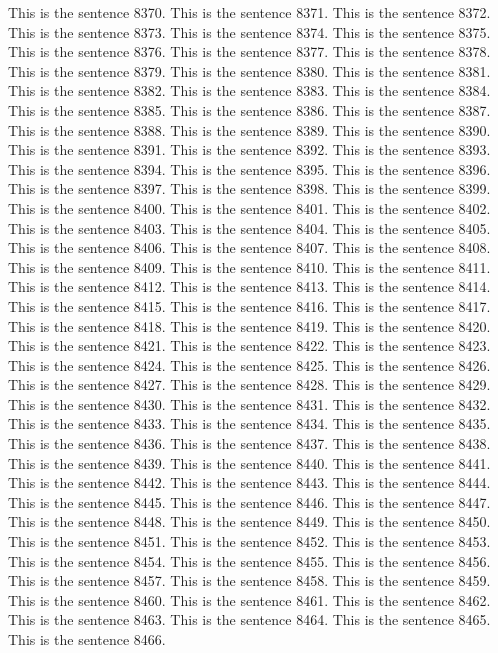 \documentclass{article}
\begin{document}
This is the sentence 8370.
This is the sentence 8371.
This is the sentence 8372.
This is the sentence 8373.
This is the sentence 8374.
This is the sentence 8375.
This is the sentence 8376.
This is the sentence 8377.
This is the sentence 8378.
This is the sentence 8379.
This is the sentence 8380.
This is the sentence 8381.
This is the sentence 8382.
This is the sentence 8383.
This is the sentence 8384.
This is the sentence 8385.
This is the sentence 8386.
This is the sentence 8387.
This is the sentence 8388.
This is the sentence 8389.
This is the sentence 8390.
This is the sentence 8391.
This is the sentence 8392.
This is the sentence 8393.
This is the sentence 8394.
This is the sentence 8395.
This is the sentence 8396.
This is the sentence 8397.
This is the sentence 8398.
This is the sentence 8399.
This is the sentence 8400.
This is the sentence 8401.
This is the sentence 8402.
This is the sentence 8403.
This is the sentence 8404.
This is the sentence 8405.
This is the sentence 8406.
This is the sentence 8407.
This is the sentence 8408.
This is the sentence 8409.
This is the sentence 8410.
This is the sentence 8411.
This is the sentence 8412.
This is the sentence 8413.
This is the sentence 8414.
This is the sentence 8415.
This is the sentence 8416.
This is the sentence 8417.
This is the sentence 8418.
This is the sentence 8419.
This is the sentence 8420.
This is the sentence 8421.
This is the sentence 8422.
This is the sentence 8423.
This is the sentence 8424.
This is the sentence 8425.
This is the sentence 8426.
This is the sentence 8427.
This is the sentence 8428.
This is the sentence 8429.
This is the sentence 8430.
This is the sentence 8431.
This is the sentence 8432.
This is the sentence 8433.
This is the sentence 8434.
This is the sentence 8435.
This is the sentence 8436.
This is the sentence 8437.
This is the sentence 8438.
This is the sentence 8439.
This is the sentence 8440.
This is the sentence 8441.
This is the sentence 8442.
This is the sentence 8443.
This is the sentence 8444.
This is the sentence 8445.
This is the sentence 8446.
This is the sentence 8447.
This is the sentence 8448.
This is the sentence 8449.
This is the sentence 8450.
This is the sentence 8451.
This is the sentence 8452.
This is the sentence 8453.
This is the sentence 8454.
This is the sentence 8455.
This is the sentence 8456.
This is the sentence 8457.
This is the sentence 8458.
This is the sentence 8459.
This is the sentence 8460.
This is the sentence 8461.
This is the sentence 8462.
This is the sentence 8463.
This is the sentence 8464.
This is the sentence 8465.
This is the sentence 8466.
\end{document}
